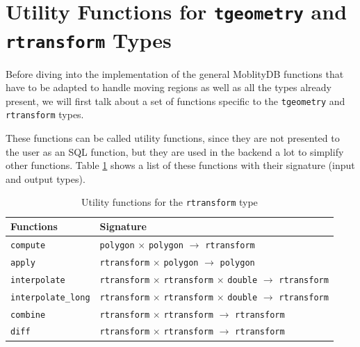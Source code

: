 
\section{Utility Functions for \texttt{tgeometry} and \texttt{rtransform} Types}
\label{section:utility_rtransform}

Before diving into the implementation of the general MoblityDB functions that have to be adapted to handle moving regions as well as all the types already present, we will first talk about a set of functions specific to the \lstinline{tgeometry} and \lstinline{rtransform} types.

These functions can be called utility functions, since they are not presented to the user as an SQL function, but they are used in the backend a lot to simplify other functions. Table \ref{table:rtransform_functions} shows a list of these functions with their signature (input and output types).

\begin{table}[h!]
    \centering
    \begin{tabular}[c]{|l|l|} 
    \hline
    \textbf{Functions}  & \textbf{Signature} \\ 
    \hline
    \lstinline+compute+ & \lstinline+polygon+ $\times$ \lstinline+polygon+ $\rightarrow$ \lstinline+rtransform+ \\
    \lstinline+apply+ & \lstinline+rtransform+ $\times$ \lstinline+polygon+ $\rightarrow$ \lstinline+polygon+ \\
    \hline
    \lstinline+interpolate+ & \lstinline+rtransform+ $\times$ \lstinline+rtransform+ $\times$ \lstinline+double+  $\rightarrow$ \lstinline+rtransform+ \\
    \lstinline+interpolate_long+ & \lstinline+rtransform+ $\times$ \lstinline+rtransform+ $\times$ \lstinline+double+  $\rightarrow$ \lstinline+rtransform+ \\
    \hline
    \lstinline+combine+ & \lstinline+rtransform+ $\times$ \lstinline+rtransform+ $\rightarrow$ \lstinline+rtransform+ \\
    \lstinline+diff+ & \lstinline+rtransform+ $\times$ \lstinline+rtransform+ $\rightarrow$ \lstinline+rtransform+ \\
    \hline
    \end{tabular}
    \caption{Utility functions for the \lstinline{rtransform} type}
    \label{table:rtransform_functions}
\end{table}

